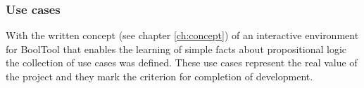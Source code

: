 \subsubsection{Use cases}

With the written concept (see chapter \vref{ch:concept}) of an interactive environment for BoolTool 
that enables the learning  of simple facts about propositional logic the collection of use cases was defined. 
These use cases represent the real value of the project 
and they mark the criterion for completion of development.



